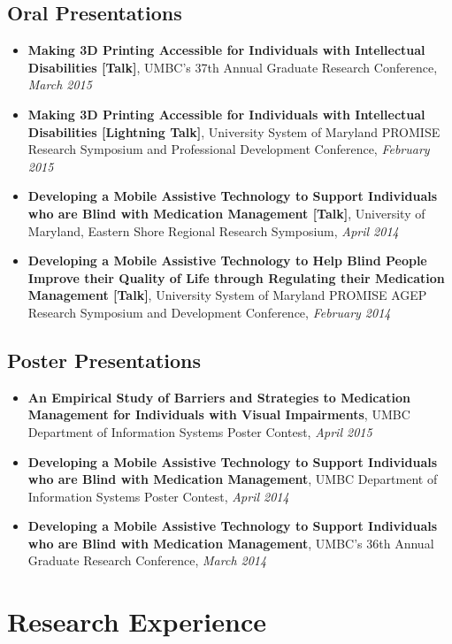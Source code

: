 \documentclass[10pt,a4paper,roman]{moderncv}        %
\begin{document}
\subsection{Oral Presentations}
\begin{itemize}
\item{\textbf{Making 3D Printing Accessible for Individuals with Intellectual Disabilities [Talk]}, UMBC's 37th Annual Graduate Research Conference, \textit{March 2015}}
\item{\textbf{Making 3D Printing Accessible for Individuals with Intellectual Disabilities [Lightning Talk]}, University System of Maryland PROMISE Research Symposium and Professional Development Conference, \textit{February 2015}}
\item{\textbf{Developing a Mobile Assistive Technology to Support Individuals who are Blind with Medication Management [Talk]}, University of Maryland, Eastern Shore Regional Research Symposium, \textit{April 2014}}
\item{\textbf{Developing a Mobile Assistive Technology to Help Blind People Improve their Quality of Life through Regulating their Medication Management [Talk]}, University System of Maryland PROMISE AGEP Research Symposium and Development Conference, \textit{February 2014}}
\end{itemize}

\subsection{Poster Presentations}
\begin{itemize}
\item{\textbf{An Empirical Study of Barriers and Strategies to Medication Management for Individuals with Visual Impairments}, UMBC Department of Information Systems Poster Contest, \textit{April 2015}}
\item{\textbf{Developing a Mobile Assistive Technology to Support Individuals who are Blind with Medication Management}, UMBC Department of Information Systems Poster Contest, \textit{April 2014}}
\item{\textbf{Developing a Mobile Assistive Technology to Support Individuals who are Blind with Medication Management}, UMBC's 36th Annual Graduate Research Conference, \textit{March 2014}}
\end{itemize}

\section{Research Experience}
\end{document}
